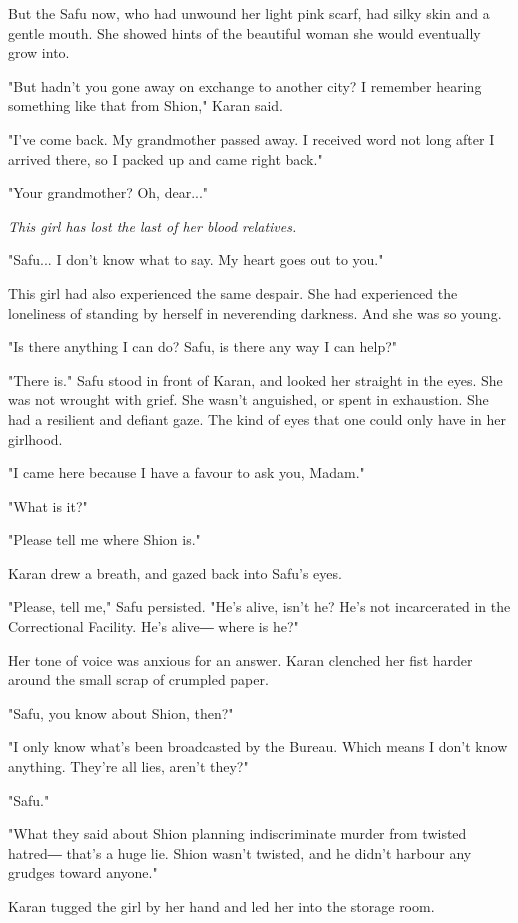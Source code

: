 But the Safu now, who had unwound her light pink scarf, had silky skin
and a gentle mouth. She showed hints of the beautiful woman she would
eventually grow into.

"But hadn't you gone away on exchange to another city? I remember
hearing something like that from Shion," Karan said.

"I've come back. My grandmother passed away. I received word not long
after I arrived there, so I packed up and came right back."

"Your grandmother? Oh, dear..."

\emph{This girl has lost the last of her blood relatives.}

"Safu... I don't know what to say. My heart goes out to you."

This girl had also experienced the same despair. She had experienced the
loneliness of standing by herself in neverending darkness. And she was
so young.

"Is there anything I can do? Safu, is there any way I can help?"

"There is." Safu stood in front of Karan, and looked her straight in the
eyes. She was not wrought with grief. She wasn't anguished, or spent in
exhaustion. She had a resilient and defiant gaze. The kind of eyes that
one could only have in her girlhood.

"I came here because I have a favour to ask you, Madam."

"What is it?"

"Please tell me where Shion is."

Karan drew a breath, and gazed back into Safu's eyes.

"Please, tell me," Safu persisted. "He's alive, isn't he? He's not
incarcerated in the Correctional Facility. He's alive― where is he?"

Her tone of voice was anxious for an answer. Karan clenched her fist
harder around the small scrap of crumpled paper.

"Safu, you know about Shion, then?"

"I only know what's been broadcasted by the Bureau. Which means I don't
know anything. They're all lies, aren't they?"

"Safu."

"What they said about Shion planning indiscriminate murder from twisted
hatred― that's a huge lie. Shion wasn't twisted, and he didn't harbour
any grudges toward anyone."

Karan tugged the girl by her hand and led her into the storage room.

